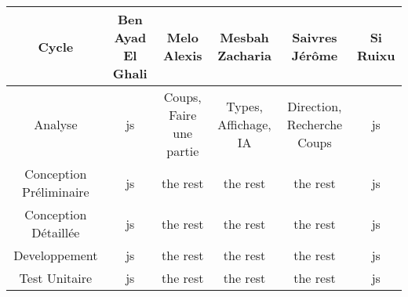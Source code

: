 \begin{tabular}{|*{6}{c|}}
    \hline
   	Cycle  & Ben Ayad El Ghali  & Melo Alexis  & Mesbah Zacharia  & Saivres Jérôme  & Si Ruixu \\
    \hline
    Analyse  & js  & Coups, Faire une partie  & Types, Affichage, IA  &  Direction, Recherche Coups& js \\
    \hline
   	Conception Préliminaire & js  & the rest  & the rest  & the rest & js \\
    \hline
   	Conception Détaillée & js  & the rest  & the rest  & the rest & js \\
    \hline
   	 Developpement & js  & the rest  & the rest  & the rest & js \\
    \hline
   	 Test Unitaire  &js  & the rest  & the rest  & the rest & js \\
    \hline
\end{tabular}